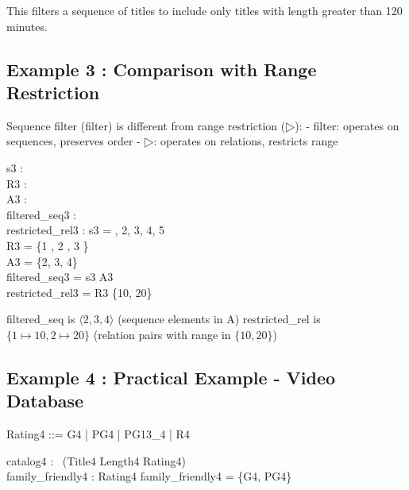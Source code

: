 \documentclass[a4paper,10pt,fleqn]{article}
\begin{document}
\noindent This filters a sequence of titles to include only titles with length greater than 120 minutes.

\bigskip

\subsection*{Example 3 : Comparison with Range Restriction}

\noindent Sequence filter (filter) is different from range restriction ($\rres$): - filter: operates on sequences, preserves order - $\rres$: operates on relations, restricts range

\bigskip

\begin{axdef}
s3 : \seq~\nat \\
R3 : \nat \rel \nat \\
A3 : \power \nat \\
filtered\_seq3 : \seq~\nat \\
restricted\_rel3 : \nat \rel \nat
\where
s3 = , 2, 3, 4, 5 \rangle \land \\
\quad R3 = \{1 , 2 , 3 \} \land \\
\quad A3 = \{2, 3, 4\} \land \\
\quad filtered\_seq3 = s3 \filter A3 \land \\
\quad restricted\_rel3 = R3 \rres \{10, 20\}
\end{axdef}

\noindent filtered\_seq is $\langle 2, 3, 4 \rangle$ (sequence elements in A) restricted\_rel is $\{1 \mapsto 10, 2 \mapsto 20\}$ (relation pairs with range in $\{10, 20\}$)

\bigskip

\subsection*{Example 4 : Practical Example - Video Database}

\begin{zed}
\end{zed}

\begin{zed}
Rating4 ::= G4 | PG4 | PG13_4 | R4
\end{zed}

\begin{axdef}
catalog4 : \seq~(Title4 \cross Length4 \cross Rating4) \\
family\_friendly4 : \power Rating4
\where
family\_friendly4 = \{G4, PG4\}
\end{axdef}
\end{document}
